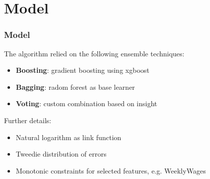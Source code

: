 \documentclass{beamer}
\begin{document}

\section{Model}
\begin{frame}
\frametitle{Model}
The algorithm relied on the following ensemble techniques:
\begin{itemize}
	\item \textbf{Boosting}: gradient boosting using xgboost
	\item \textbf{Bagging}: radom forest as base learner
	\item \textbf{Voting}: custom combination based on insight
\end{itemize}
Further details:
\begin{itemize}
	\item Natural logarithm as link function
	\item Tweedie distribution of errors
	\item Monotonic constraints for selected features, e.g. WeeklyWages
\end{itemize}
\end{frame}
\end{document}
